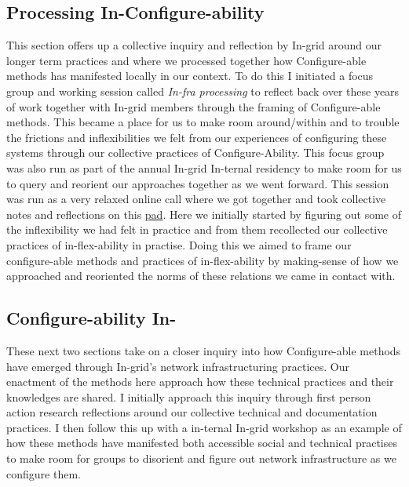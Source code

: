 \hypertarget{processing-in-configure-ability}{%
\subsection{Processing
In-Configure-ability}\label{processing-in-configure-ability}}

This section offers up a collective inquiry and reflection by In-grid
around our longer term practices and where we processed together how
Configure-able methods has manifested locally in our context. To do this
I initiated a focus group and working session called \emph{In-fra
processing} to reflect back over these years of work together with
In-grid members through the framing of Configure-able methods. This
became a place for us to make room around/within and to trouble the
frictions and inflexibilities we felt from our experiences of
configuring these systems through our collective practices of
Configure-Ability. This focus group was also run as part of the annual
In-grid In-ternal residency to make room for us to query and reorient
our approaches together as we went forward. This session was run as a
very relaxed online call where we got together and took collective notes
and reflections on this
\href{https://digitalcare.noho.st/pad/p/Infra_processing}{pad}. Here we
initially started by figuring out some of the inflexibility we had felt
in practice and from them recollected our collective practices of
in-flex-ability in practise. Doing this we aimed to frame our
configure-able methods and practices of in-flex-ability by making-sense
of how we approached and reoriented the norms of these relations we came
in contact with.

\hypertarget{configure-ability-in-}{%
\subsection{Configure-ability In-}\label{configure-ability-in-}}

These next two sections take on a closer inquiry into how Configure-able
methods have emerged through In-grid's network infrastructuring
practices. Our enactment of the methods here approach how these
technical practices and their knowledges are shared. I initially
approach this inquiry through first person action research reflections
around our collective technical and documentation practices. I then
follow this up with a in-ternal In-grid workshop as an example of how
these methods have manifested both accessible social and technical
practises to make room for groups to disorient and figure out network
infrastructure as we configure them.

